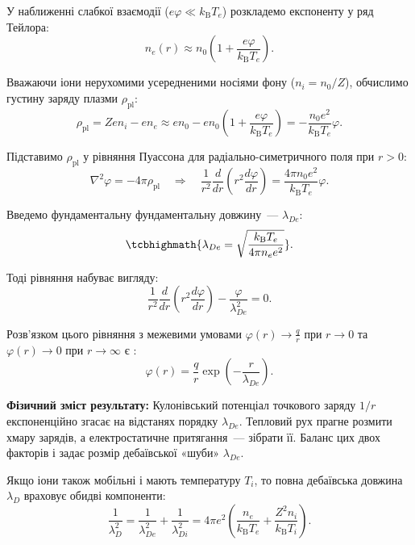 У наближенні слабкої взаємодії ($e\varphi \ll k_{\mathrm B}T_e$) розкладемо експоненту у ряд Тейлора:
\begin{equation}
	n_e(r) \approx n_0 \left(1 + \frac{e\varphi}{k_{\mathrm B}T_e}\right).
\end{equation}

Вважаючи іони нерухомими усередненими носіями фону ($n_i = n_0/Z$), обчислимо густину заряду плазми $\rho_{\mathrm{pl}}$:
\begin{equation}
	\rho_{\mathrm{pl}} = Z e n_i - e n_e \approx e n_0 - e n_0\left(1 + \frac{e\varphi}{k_{\mathrm B}T_e}\right) = -\frac{n_0 e^2}{k_{\mathrm B}T_e}\varphi.
\end{equation}

Підставимо $\rho_{\mathrm{pl}}$ у рівняння Пуассона для радіально-симетричного поля при $r > 0$:
\begin{equation}
	\nabla^2\varphi = -4\pi\rho_{\mathrm{pl}} \quad \Rightarrow \quad \frac{1}{r^2}\frac{d}{dr}\left(r^2\frac{d\varphi}{dr}\right) = \frac{4\pi n_0 e^2}{k_{\mathrm B}T_e}\varphi.
\end{equation}

Введемо фундаментальну фундаментальну довжину~---  $\lambda_{De}$:
\begin{equation}
	\tcbhighmath{\lambda_{De} = \sqrt{\frac{k_{\mathrm B}T_e}{4\pi n_e e^2}}}.
\end{equation}

Тоді рівняння набуває вигляду:
\begin{equation}
	\frac{1}{r^2}\frac{d}{dr}\left(r^2\frac{d\varphi}{dr}\right) - \frac{\varphi}{\lambda_{De}^2} = 0.
\end{equation}

Розв'язком цього рівняння з межевими умовами $\varphi(r) \to \frac{q}{r}$ при $r \to 0$ та $\varphi(r) \to 0$ при $r \to \infty$ є :
\begin{equation}
	\varphi(r) = \frac{q}{r} \exp\left(-\frac{r}{\lambda_{De}}\right).
\end{equation}

\textbf{Фізичний зміст результату:} Кулонівський потенціал точкового заряду $1/r$ експоненційно згасає на відстанях порядку $\lambda_{De}$. Тепловий рух прагне розмити хмару зарядів, а електростатичне притягання~--- зібрати її. Баланс цих двох факторів і задає розмір дебаївської «шуби» $\lambda_{De}$.

Якщо іони також мобільні і мають температуру $T_i$, то повна дебаївська довжина $\lambda_D$ враховує обидві компоненти:
\begin{equation}
	\frac{1}{\lambda_D^2} = \frac{1}{\lambda_{De}^2} + \frac{1}{\lambda_{Di}^2} = 4\pi e^2 \left(\frac{n_e}{k_{\mathrm B}T_e} + \frac{Z^2 n_i}{k_{\mathrm B}T_i}\right).
\end{equation}

